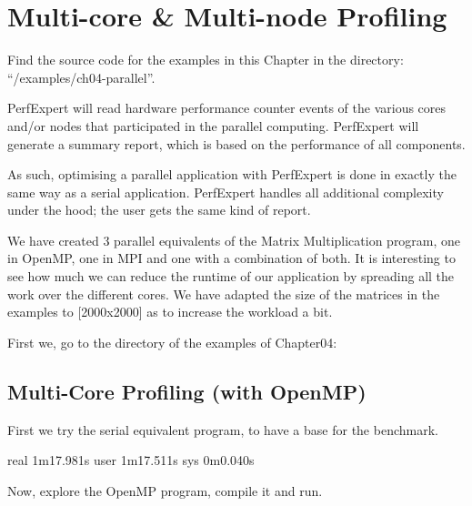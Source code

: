 \chapter{Multi-core \& Multi-node Profiling}
\label{ch:ch04_multi_core_multi_node_profiling}

\renewcommand{\exampledir}{examples/ch04-parallel}

\begin{tip}
Find the source code for the examples in this Chapter in the directory:  ``\tilde/\exampledir''.
\end{tip}

PerfExpert will read hardware performance counter events of the various cores and/or nodes that participated in the parallel computing. PerfExpert will generate a summary report, which is based on the performance of all components.

As such, optimising a parallel application with PerfExpert is done in exactly the same way as a serial application. PerfExpert handles all additional complexity under the hood; the user gets the same kind of report.

We have created 3 parallel equivalents of the Matrix Multiplication program, one in OpenMP, one in MPI and one with a combination of both. It is interesting to see how much we can reduce the runtime of our application by spreading all the work over the different cores. We have adapted the size of the matrices in the examples to [2000x2000] as to increase the workload a bit.

First we, go to the directory of the examples of Chapter04:

\begin{prompt}
\end{prompt}

\section{Multi-Core Profiling (with OpenMP)}
\label{sec:Multi_core_profilingi_OpenMP}

First we try the serial equivalent program, to have a base for the benchmark.

\begin{prompt}
real 1m17.981s
user 1m17.511s
sys 0m0.040s
\end{prompt}

Now, explore the OpenMP program, compile it and run.


